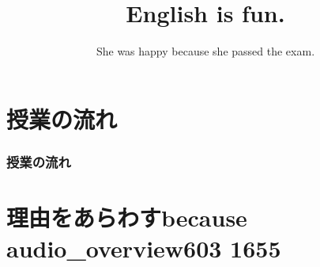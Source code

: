 \documentclass[aspectratio=169,xcolor={dvipsnames,table}]{beamer}
\title{English is fun.}
\subtitle{She was happy because she passed the exam.}
\author{}
\institute[]{}
\date[]
\begin{document}
\begin{frame}[plain]
  \titlepage
\end{frame}

\section*{授業の流れ}
\begin{frame}[plain]
  \frametitle{授業の流れ}
  \tableofcontents
\end{frame}

\section{理由をあらわすbecause\\{\tiny audio\_overview603 1655}\,{\scriptsize {}}}
\end{document}

